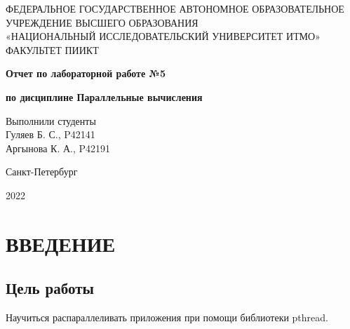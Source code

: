 \documentclass[14pt, a4paper, oneside, final]{extarticle}
\begin{document}
 
\setcounter{page}{0}
\begin{center} 
\small
\footnotesize{ФЕДЕРАЛЬНОЕ ГОСУДАРСТВЕННОЕ АВТОНОМНОЕ ОБРАЗОВАТЕЛЬНОЕ}\\
\footnotesize{УЧРЕЖДЕНИЕ ВЫСШЕГО ОБРАЗОВАНИЯ}\\ 
\footnotesize{«НАЦИОНАЛЬНЫЙ ИССЛЕДОВАТЕЛЬСКИЙ УНИВЕРСИТЕТ ИТМО»}\\
\hfill \break 
\footnotesize{ФАКУЛЬТЕТ ПИИКТ}\\
\hfill \break
\hfill \break 
\hfill \break
\large{
    \textbf{Отчет по лабораторной работе №5}

    \textbf{по дисциплине Параллельные вычисления}
}

\hfill \break 
\end{center} 
\begin{flushright} 
Выполнили студенты\\
Гуляев Б. С., P42141\\
Аргынова К. А., P42191\\
\end{flushright}
\vspace*{\fill}
\begin{center}
Санкт-Петербург

2022
\end{center}
\normalsize
\thispagestyle{empty}

\clearpage
\section*{ВВЕДЕНИЕ}
\subsection*{Цель работы}
Научиться распараллеливать приложения при помощи библиотеки pthread.
\end{document}
